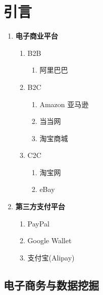 \documentclass[twoside,9pt]{article}
\begin{document}
\begin{flushleft}
	\noindent
	\par\par
	
	
\end{flushleft}


\section{引言}

\begin{enumerate}
	\item \textbf{电子商业平台}
		\begin{enumerate}
			\item B2B
				\begin{enumerate}
					\item 阿里巴巴
				\end{enumerate}
			\item B2C
				\begin{enumerate}
					\item Amazon 亚马逊
					\item 当当网
					\item 淘宝商城
				\end{enumerate}
			\item C2C
				\begin{enumerate}
					\item 淘宝网
					\item eBay
				\end{enumerate}
		\end{enumerate}

	\item \textbf{第三方支付平台}
		\begin{enumerate}
			\item PayPal
			\item Google Wallet
			\item 支付宝(Alipay)
		\end{enumerate}
\end{enumerate}


\subsection{电子商务与数据挖掘}
\end{document}
